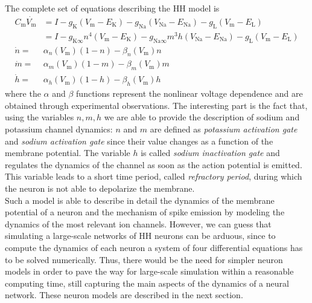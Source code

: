 \documentclass[a4paper, 12pt, twoside, openright]{book}
\begin{document}
The complete set of equations describing the HH model is
\begin{equation}
    \begin{split}
        C_{\text{m}}\dot{V_{\text{m}}} &= I - g_{\text{K}}(V_{\text{m}}-E_{\text{K}}) - g_{\text{Na}}(V_{\text{Na}}-E_{\text{Na}}) - g_{\text{L}}(V_{\text{m}} - E_{\text{L}})\\
        &= I - g_{\text{K}\infty}n^4(V_{\text{m}}-E_{\text{K}}) - g_{\text{Na}\infty}m^3h(V_{\text{Na}}-E_{\text{Na}}) - g_{\text{L}}(V_{\text{m}} - E_{\text{L}})\\
        \dot{n} =& \alpha_{n}(V_{\text{m}}) (1-n) - \beta_{n}(V_{\text{m}})n\\
        \dot{m} =& \alpha_{m}(V_{\text{m}}) (1-m) - \beta_{m}(V_{\text{m}})m\\
        \dot{h} =& \alpha_{h}(V_{\text{m}}) (1-h) - \beta_{h}(V_{\text{m}})h
    \end{split}
\end{equation}
where the $\alpha$ and $\beta$ functions represent the nonlinear voltage dependence and are obtained through experimental observations. The interesting part is the fact that, using the variables $n,m,h$ we are able to provide the description of sodium and potassium channel dynamics: $n$ and $m$ are defined as \textit{potassium activation gate} and \textit{sodium activation gate} since their value changes as a function of the membrane potential. The variable $h$ is called \textit{sodium inactivation gate} and regulates the dynamics of the channel as soon as the action potential is emitted. This variable leads to a short time period, called \textit{refractory period}, during which the neuron is not able to depolarize the membrane.\\
Such a model is able to describe in detail the dynamics of the membrane potential of a neuron and the mechanism of spike emission by modeling the dynamics of the most relevant ion channels. However, we can guess that simulating a large-scale networks of HH neurons can be arduous, since to compute the dynamics of each neuron a system of four differential equations has to be solved numerically. Thus, there would be the need for simpler neuron models in order to pave the way for large-scale simulation within a reasonable computing time, still capturing the main aspects of the dynamics of a neural network. These neuron models are described in the next section.
\end{document}

